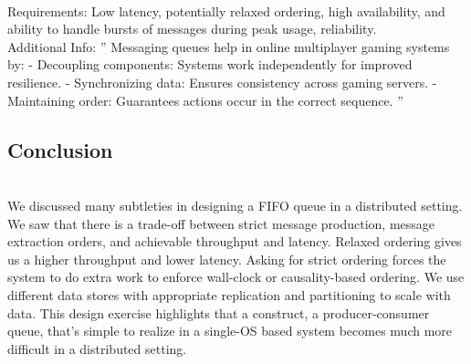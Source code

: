 \\
Requirements: Low latency, potentially relaxed ordering, high availability, and ability to handle bursts of messages during peak usage, reliability.
\\
Additional Info: '' Messaging queues help in online multiplayer gaming systems by: - Decoupling components: Systems work independently for improved resilience. - Synchronizing data: Ensures consistency across gaming servers. - Maintaining order: Guarantees actions occur in the correct sequence. ''

\subsection{Conclusion}\label{B99e2z15vbAbkVogaQPHm}
\\
\hfill\break
We discussed many subtleties in designing a FIFO queue in a distributed setting. We saw that there is a trade-off between strict message production, message extraction orders, and achievable throughput and latency. Relaxed ordering gives us a higher throughput and lower latency. Asking for strict ordering forces the system to do extra work to enforce wall-clock or causality-based ordering. We use different data stores with appropriate replication and partitioning to scale with data. This design exercise highlights that a construct, a producer-consumer queue, that's simple to realize in a single-OS based system becomes much more difficult in a distributed setting.\\
\strut \\

